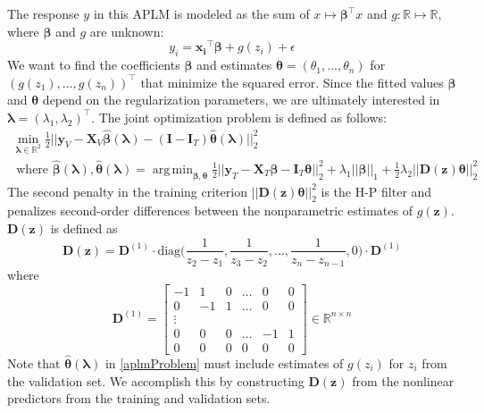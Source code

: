 \documentclass[10pt,letterpaper]{article}
\DeclareMathOperator*{\argmin}{arg\,min}
\begin{document}
The response $y$ in this APLM is modeled as the sum of $x \mapsto \boldsymbol \beta^\top x $ and $g: \mathbb{R} \mapsto \mathbb{R}$, where $\boldsymbol \beta$ and $g$ are unknown:
\begin{equation}
y_i = \boldsymbol{x_i}^\top \boldsymbol{\beta} + g(z_i) + \epsilon
\end{equation}
We want to find the coefficients $\boldsymbol{\beta}$ and estimates $\boldsymbol{\theta} = (\theta_1, ..., \theta_n)$ for $(g(z_1), ..., g(z_n))^\top$ that minimize the squared error. Since the fitted values $\boldsymbol{\beta}$ and $\boldsymbol{\theta}$ depend on the regularization parameters, we are ultimately interested in $\boldsymbol\lambda = (\lambda_1, \lambda_2)^\top$. The joint optimization problem is defined as follows:
\begin{equation}
\begin{array}{c}
\min_{\boldsymbol\lambda \in \mathbb{R}^2} \frac{1}{2}
\bigl\lvert\bigl\lvert
\boldsymbol{y}_V
- \boldsymbol{X}_V\hat{\boldsymbol{\beta}}(\boldsymbol{\lambda})
- (\boldsymbol{I} - \boldsymbol{I}_T) \hat{\boldsymbol{\theta}}(\boldsymbol{\lambda})
\bigl\rvert\bigl\rvert^2_2 \\
\text{ where }
\hat{\boldsymbol{\beta}}(\boldsymbol{\lambda}),
\hat{\boldsymbol{\theta}}(\boldsymbol{\lambda}) =
\argmin_{\boldsymbol{\beta}, \boldsymbol{\theta}}
\frac{1}{2} \bigl\lvert\bigl\lvert
\boldsymbol{y}_T
- \boldsymbol{X}_T\boldsymbol{\beta}
- \boldsymbol{I}_T \boldsymbol{\theta} \bigl\rvert\bigl\rvert^2_2
+ \lambda_1 \lvert\lvert \boldsymbol{\beta}
\rvert \rvert_1
+ \frac{1}{2} \lambda_2 \lvert\lvert \boldsymbol{D}(\boldsymbol{z}) \boldsymbol{\theta} \rvert \rvert_2^2
\end{array}
\label{aplmProblem}
\end{equation}
The second penalty in the training criterion $\lvert\lvert \boldsymbol{D}(\boldsymbol{z}) \boldsymbol{\theta} \rvert \rvert_2^2$ is the H-P filter and penalizes second-order differences between the nonparametric estimates of $g(\boldsymbol{z})$. $\boldsymbol{D}(\boldsymbol{z})$ is defined as
\begin{equation}
\boldsymbol{D}(\boldsymbol{z}) = \boldsymbol{D}^{(1)} \cdot
\text{diag} \big ( \frac{1}{z_{2} - z_1}, \frac{1}{z_{3} - z_2}, ... , \frac{1}{z_{n} - z_{n-1}}, 0 \big )
\cdot \boldsymbol{D}^{(1)}
\end{equation}
where
\begin{equation}
\boldsymbol{D}^{(1)} = 
\begin{bmatrix}
-1 & 1 & 0 & ... & 0 & 0 \\
0 & -1 & 1 & ... & 0 & 0 \\
\vdots \\
0 & 0 & 0 & ... & -1 & 1 \\
0 &0 & 0 &  0  &  0 & 0
\end{bmatrix}
\in
\mathbb{R}^{n\times n}
\end{equation}
Note that $\hat{\boldsymbol{\theta}}(\boldsymbol{\lambda})$ in \eqref{aplmProblem} must include estimates of $g(z_i)$ for  $z_i$ from the validation set. We accomplish this by constructing $\boldsymbol{D}(\boldsymbol{z})$ from the nonlinear predictors from the training and validation sets.
\end{document}
